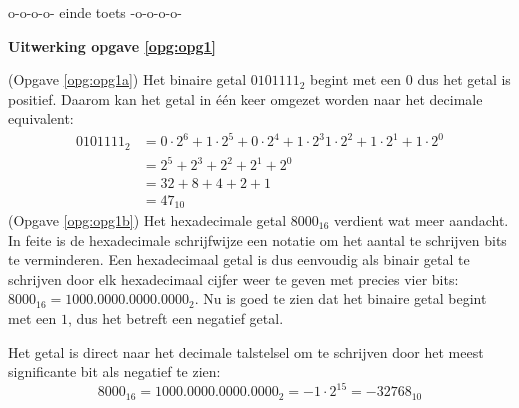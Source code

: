 \documentclass[a4paper,12pt,addpoints,fleqn,dutch,concept]{tisdexam}
\begin{document}
\begin{questions}


\vspace{4em}
\begin{center}
o-o-o-o- einde toets -o-o-o-o-
\end{center}




\ifprintanswers
\newpage
\textbf{Uitwerking opgave \ref{opg:opg1}}

(Opgave \ref{opg:opg1a}) Het binaire getal $0101111_{2}$ begint met een $0$ dus het getal is positief.
Daarom kan het getal in \'{e}\'{e}n keer omgezet worden naar het decimale equivalent:
\begin{equation*}
\begin{split}
0101111_{2} &= 0 \cdot 2^{6} + 1 \cdot 2^{5} + 0 \cdot 2^{4} + 1 \cdot 2^{3} 1 \cdot 2^{2} + 1 \cdot 2^{1} + 1 \cdot 2^{0} \\
            &= 2^{5} + 2^{3} + 2^{2} + 2^{1} + 2^{0} \\
            &= 32 + 8 + 4 + 2 + 1 \\
            &= 47_{10}
\end{split}
\end{equation*}
(Opgave \ref{opg:opg1b}) Het hexadecimale getal $8000_{16}$ verdient wat meer aandacht. In feite is de
hexadecimale schrijfwijze een notatie om het aantal te schrijven bits te verminderen. Een hexadecimaal
getal is dus eenvoudig als binair getal te schrijven door elk hexadecimaal cijfer weer te geven met
precies vier bits: $8000_{16} = 1000.0000.0000.0000_{2}$. Nu is goed
te zien dat het binaire getal begint met een $1$, dus het betreft een negatief getal.

Het getal is direct naar het decimale talstelsel om te schrijven door het meest significante bit
als negatief te zien:
\begin{equation*}
8000_{16} = 1000.0000.0000.0000_{2} = -1 \cdot 2^{15} = -32768_{10}
\end{equation*}


\end{questions}
\end{document}

